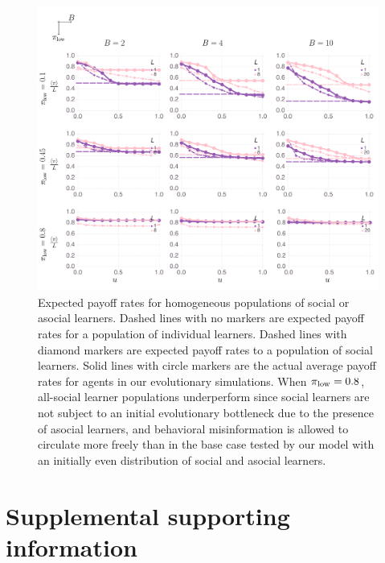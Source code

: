 \documentclass[letterpaper,11.5pt]{scrartcl}
\begin{document}
\begin{figure}
  \caption{Expected payoff rates for homogeneous populations of social or asocial learners. Dashed lines with no markers are expected payoff rates for a population of individual learners. Dashed lines with diamond markers are expected payoff rates to a population of social learners. Solid lines with circle markers are the actual average payoff rates for agents in our evolutionary simulations.  When $\pi_{\mathrm{low}} = 0.8$, all-social learner populations underperform
    since social learners are not subject to an initial evolutionary bottleneck
    due to the presence of asocial learners, and behavioral misinformation
    is allowed to circulate more freely than in the base case tested by 
    our model with an initially even distribution of social and asocial learners.
}
  \label{fig:fullMeanPrevNetPayoffs}
  \centering
    \includegraphics[width=\textwidth]{Figures/supplement/fullMeanPrevNetPayoffs.pdf}
\end{figure}

\newpage


\section{Supplemental supporting information}
\end{document}
